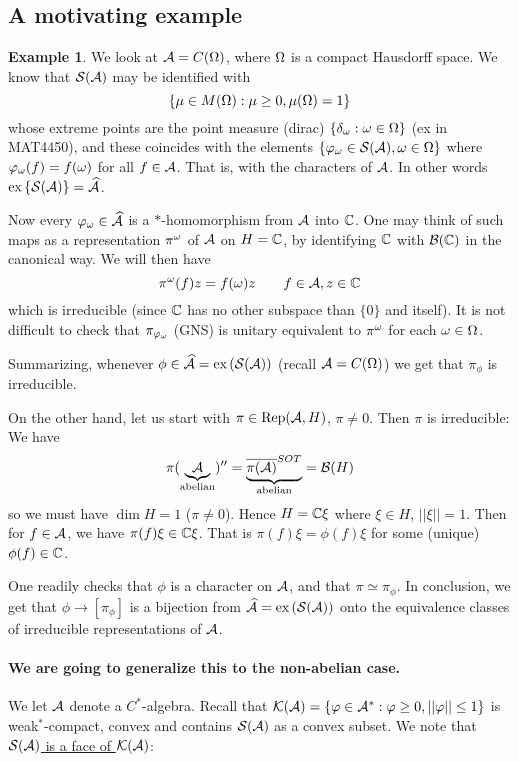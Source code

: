 \documentclass[10pt,english,a4paper]{article}
\theoremstyle{definition}
\newtheorem*{example}{Example}
\def\ex{\textnormal{ex}\,}
\def\whAs{\widehat{\As}}
\DeclareMathOperator{\Rep}{Rep}
\def\vphi{\varphi}
\begin{document}
\subsection*{A motivating example}
\begin{example}
We look at $\mathcal{A} = C(\Omega)$, where $\Omega$ is a compact Hausdorff space. 
We know that $\mathcal{S}(\mathcal{A})$ may be identified with 
\[ \{ \mu \in M(\Omega) : \mu \geq 0, \mu(\Omega) =1\} \] 
whose extreme points are the point measure (dirac) 
$\{\delta_{\omega}: \omega \in \Omega\}$ (ex in MAT4450), and these coincides with 
the elements $\{ \vphi_{\om} \in \Ss(\As), \om \in \Om \}$
where $\vphi_{\om}(f) = f(\om)$ for all $f \in \mathcal{A}$.
That is, with the characters of $\mathcal{A}$. In other words
$\ex \{\Ss(\As)\} = \widehat{\As}$.

Now every $\vphi_{\om} \in \whAs$ is a $*$-homomorphism from $\mathcal{A}$ into 
$\mathbb{C}$. One may think of such maps as a representation $\pi^{\omega}$ of $\mathcal{A}$
on $H=\mathbb{C}$, by identifying $\mathbb{C}$ with $\mathcal{B}(\mathbb{C})$ in the canonical way. 
We will then have 
\[ \pi^{\omega}(f)z = f(\omega)z\qquad f \in \mathcal{A}, z\in \mathbb{C} \]
which is irreducible (since $\mathbb{C}$ has no other subspace than $\{0\}$ and itself).
It is not difficult to check that $\pi_{\vphi_{\om}}$ (GNS) is unitary equivalent 
to $\pi^{\omega}$ for each $\omega \in \Omega$.

Summarizing, whenever $\phi \in \whAs = \ex(\Ss(\As))$ (recall $\mathcal{A} =
C(\Omega)$) we get that $\pi_{\phi}$ is irreducible.

On the other hand, let us start with $\pi \in \Rep(\As,H)$, $\pi\neq 0$.
Then $\pi$ is irreducible: 
We have 
\[\pi(\underbrace{\mathcal{A}}_{\text{abelian}})''=\underbrace{\overline{\pi(\mathcal{A})}^{SOT}}_{\text{abelian}} = \mathcal{B}(H)\]
so we must have $\dim H = 1$ ($\pi\neq 0$). Hence $H = \mathbb{C} \xi$ where $\xi \in
H$, $||\xi||=1$.
Then for $f \in \mathcal{A}$, we have $\pi(f)\xi \in \mathbb{C}\xi$. That is $\pi(f)\xi = \phi(f)\xi$
for some (unique) $\phi(f) \in \mathbb{C}$.

One readily checks that $\phi$ is a character on $\mathcal{A}$, and that $\pi\simeq \pi_{\phi}$.
In conclusion, we get that $\phi \to [\pi_{\phi}]$ is a bijection from $\whAs = \ex(\Ss(\As))$
onto the equivalence classes of irreducible representations of $\mathcal{A}$. 
\end{example}

\paragraph{We are going 
to generalize this to the non-abelian case.}

We let $\mathcal{A}$ denote a $C^*$-algebra. Recall that 
$\Ks(\As) = \{\vphi \in \As^* : \vphi\geq 0, ||\vphi||\leq 1\}$ 
is weak$^*$-compact, convex and contains $\mathcal{S}(\mathcal{A})$ as a convex subset. 
We note that \ul{$\mathcal{S}(\mathcal{A})$ is a face of $\mathcal{K}(\mathcal{A})$}:
\end{document}

